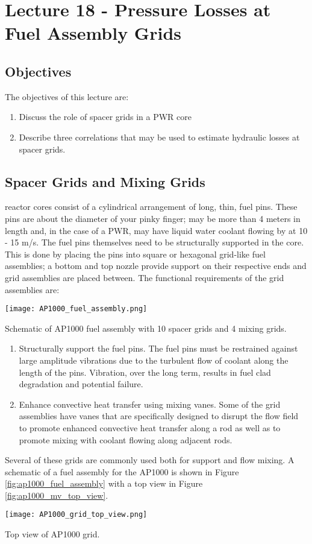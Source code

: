 \chapter{Lecture 18 - Pressure Losses at Fuel Assembly Grids}
\label{ch:ch18}
\section{Objectives}
The objectives of this lecture are:
\begin{enumerate}
\item Discuss the role of spacer grids in a PWR core
\item Describe three correlations that may be used to estimate hydraulic losses at spacer grids.
\end{enumerate}

\section{Spacer Grids and Mixing Grids}
 
 reactor cores consist of a cylindrical arrangement of long, thin, fuel pins.  These pins are about the diameter of your pinky finger; may be more than 4 meters in length and, in the case of a PWR, may have liquid water coolant flowing by at 10 - 15 m/s.  The fuel pins themselves need to be structurally supported in the core.  This is done by placing the pins into square or hexagonal grid-like fuel assemblies; a bottom and top nozzle provide support on their respective ends and grid assemblies are placed between.  The functional requirements of the grid assemblies are:
\begin{marginfigure}
\texttt{[image: AP1000\_fuel\_assembly.png]}
\caption{Schematic of AP1000 fuel assembly with 10 spacer grids and 4 mixing grids.}
\label{fig:ap1000_fuel_assembly}
\end{marginfigure}
\begin{enumerate}
\item Structurally support the fuel pins.  The fuel pins must be restrained against large amplitude vibrations due to the turbulent flow of coolant along the length of the pins.  Vibration, over the long term, results in fuel clad degradation and potential failure.  

\item Enhance convective heat transfer using mixing vanes.  Some of the grid assemblies have vanes that are specifically designed to disrupt the flow field to promote enhanced convective heat transfer along a rod as well as to promote mixing with coolant flowing along adjacent rods.  

\end{enumerate}   
Several of these grids are commonly used both for support and flow mixing.  A schematic of a fuel assembly for the AP1000 is shown in Figure \ref{fig:ap1000_fuel_assembly} with a top view in Figure \ref{fig:ap1000_mv_top_view}.
\begin{marginfigure}
\texttt{[image: AP1000\_grid\_top\_view.png]}
\caption{Top view of AP1000 grid.}
\label{fig:ap1000_mv_top_view}
\end{marginfigure}


